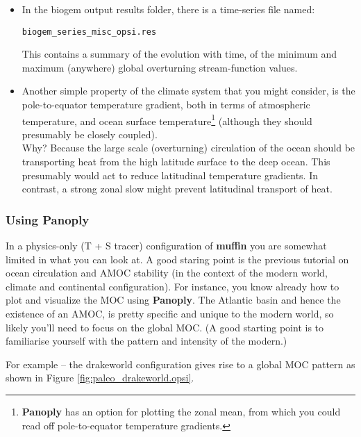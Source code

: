 \documentclass[11pt,fleqn]{book} %
\begin{document}
\vspace{1pt}
\begin{itemize}[noitemsep]
\vspace{1mm}
\item In the biogem output results folder, there is a time-series file named:
\vspace{-2pt}\begin{verbatim}
biogem_series_misc_opsi.res
\end{verbatim}\vspace{-2pt}
This contains a summary of the evolution with time, of the minimum and maximum (anywhere) global overturning stream-function values.
\vspace{1mm}
\item Another simple property of the climate system that you might consider, is the pole-to-equator temperature gradient, both in terms of atmospheric temperature, and ocean surface temperature\footnote{\textbf{Panoply} has an option for plotting the zonal mean, from which you could read off pole-to-equator temperature gradients.} (although they should presumably be closely coupled).
\\Why? Because the large scale (overturning) circulation of the ocean should be transporting heat from the high latitude surface to the deep ocean. This presumably would act to reduce latitudinal temperature gradients. In contrast, a strong zonal slow might prevent latitudinal transport of heat.
\end{itemize}


\subsubsection{Using Panoply}

In a physics-only (T + S tracer) configuration of \textbf{muffin} you are  somewhat limited in what you can look at. A good staring point is the previous tutorial on ocean circulation and AMOC stability (in the context of the modern world, climate and continental configuration). For instance, you know already how to plot and visualize the MOC using \textbf{Panoply}. The Atlantic basin and hence the existence of an AMOC, is pretty specific and unique to the modern world, so likely you'll need to focus on the global MOC. (A good starting point is to familiarise yourself with the pattern and intensity of the modern.)

For example -- the \small\textsf{drakeworld }\normalsize configuration gives rise to a global MOC pattern as shown in Figure \ref{fig:paleo_drakeworld.opsi}.
\end{document}
